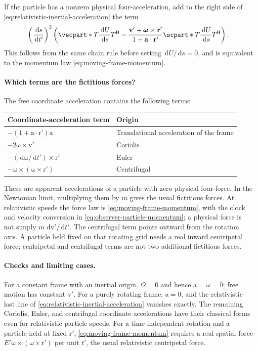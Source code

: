 \documentclass[11pt]{article}
\newcommand{\pv}[1]{{#1}}
\newcommand{\pvGreek}[1]{{#1}}
\newcommand{\vstyle}[1]{{\bm{\mathrm{#1}}}}
\newcommand{\pT}{\pv{T}}
\newcommand{\pU}{\pv{U}}
\newcommand{\pvOmega}{\pvGreek{\Omega}}
\numberwithin{equation}{section}
\newcommand{\dotprod}{\cdot}
\newcommand{\br}{\vstyle{r}}
\newcommand{\bv}{\vstyle{v}}
\newcommand{\ba}{\vstyle{a}}
\newcommand{\dd}{\,\mathrm d}
\begin{document}
If the particle has a nonzero physical four-acceleration, add to the
right side of \eqref{eq:relativistic-inertial-acceleration} the term
\[
 \left(\frac{\dd s}{\dd t'}\right)^2
 \left(
 \vecpart*{\pT\frac{\dd\pU}{\dd s}\pT^{\mathsf H}}
 -\frac{\bv'+\vstyle{\omega}\times\br'}{1+\ba\dotprod\br'}
  \scpart*{\pT\frac{\dd\pU}{\dd s}\pT^{\mathsf H}}
 \right).
\]
This follows from the same chain rule before setting
$\dd\pU/\dd s=0$, and is equivalent to the momentum law
\eqref{eq:moving-frame-momentum}.

\paragraph{Which terms are the fictitious forces?}
The free coordinate acceleration contains the following terms:
\begin{center}
\begin{tabular}{ll}
\toprule
Coordinate-acceleration term & Origin\\
\midrule
$-(1+\ba\dotprod\br')\ba$ & Translational acceleration of the frame\\
$-2\vstyle{\omega}\times\bv'$ & Coriolis\\
$-(\dd\vstyle{\omega}/\dd t')\times\br'$ & Euler\\
$-\vstyle{\omega}\times(\vstyle{\omega}\times\br')$ & Centrifugal\\
\bottomrule
\end{tabular}
\end{center}
These are apparent accelerations of a particle with zero physical
four-force. In the Newtonian limit, multiplying them by $m$ gives the
usual fictitious forces. At relativistic speeds the force law is
\eqref{eq:moving-frame-momentum}, with the clock and velocity conversion
in \eqref{eq:observer-particle-momentum}; a physical force is not
simply $m\,\dd\bv'/\dd t'$.
The centrifugal term points outward from the rotation axis. A particle
held fixed on that rotating grid needs a real inward centripetal force;
centripetal and centrifugal terms are not two additional fictitious forces.

\paragraph{Checks and limiting cases.}
For a constant frame with an inertial origin, $\pvOmega=0$ and hence
$\ba=\vstyle{\omega}=0$; free motion has constant $\bv'$.
For a purely rotating frame, $\ba=0$, and the relativistic last line
of \eqref{eq:relativistic-inertial-acceleration} vanishes exactly.
The remaining Coriolis, Euler, and centrifugal coordinate accelerations
have their classical forms even for relativistic particle speeds.
For a time-independent rotation and a particle held at fixed $\br'$,
\eqref{eq:moving-frame-momentum} requires a real spatial force
$E'\vstyle{\omega}\times(\vstyle{\omega}\times\br')$ per unit $t'$,
the usual relativistic centripetal force.
\end{document}
